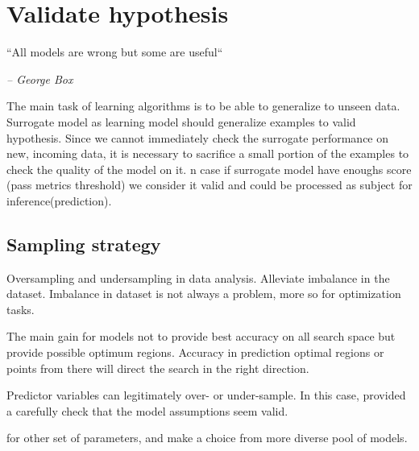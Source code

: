 \section{Validate hypothesis}
    \epigraph{``All models are wrong but some are useful``}{\textit{– George Box}}

    The main task of learning algorithms is to be able to generalize to unseen data. Surrogate model as learning model should generalize examples to valid hypothesis. 
    Since we cannot immediately check the surrogate performance on new, incoming data, it is necessary to sacrifice a small portion of the examples to check the quality of the model on it.
    n case if surrogate model have enoughs score (pass metrics threshold) we consider it valid and could be processed as subject for inference(prediction).

    \subsection{Sampling strategy}
    Oversampling and undersampling in data analysis. Alleviate imbalance in the dataset. 
    Imbalance in dataset is not always a problem, more so for optimization tasks. 

    The main gain for models not to provide best accuracy on all search space but provide possible optimum regions.
    Accuracy in prediction optimal regions or points from there will direct the search in the right direction.

    Predictor variables can legitimately over- or under-sample. 
    In this case, provided a carefully check that the model assumptions seem valid.


    for other set of parameters, and make a choice from more diverse pool of models.
